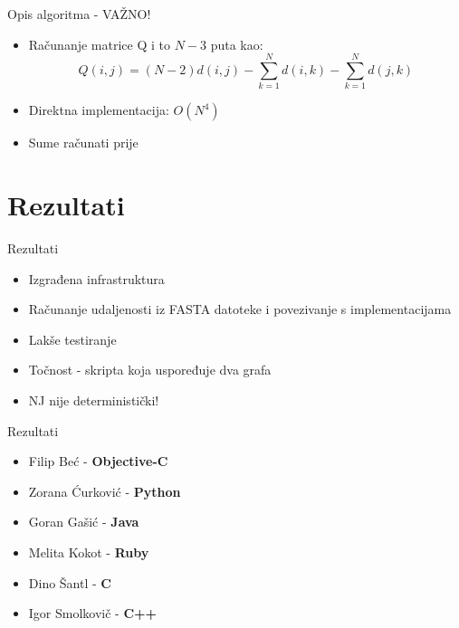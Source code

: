 \documentclass[utf8]{beamer}
\begin{document}
\begin{frame}{Opis algoritma - VAŽNO!}
\begin{itemize}
\item Računanje matrice Q i to $N-3$ puta kao: 
$$ Q(i,j) = (N-2) d(i,j) - \sum_{k=1}^{N}d(i,k) - \sum_{k=1}^{N}d(j,k) $$
\item Direktna implementacija: $O(N^4)$
\item Sume računati prije
\end{itemize}
\end{frame}


\section{Rezultati}
\begin{frame}{Rezultati}
\begin{itemize}
	\item Izgrađena infrastruktura
	\item Računanje udaljenosti iz FASTA datoteke i povezivanje s implementacijama
	\item Lakše testiranje
	\item Točnost - skripta koja uspoređuje dva grafa
	\item NJ nije deterministički!
\end{itemize}
\end{frame}

\begin{frame}{Rezultati}
\begin{itemize}
	\item Filip Beć - \textbf{Objective-C}
	\item Zorana Ćurković - \textbf{Python}
	\item Goran Gašić - \textbf{Java}
	\item Melita Kokot - \textbf{Ruby}
	\item Dino Šantl - \textbf{C}
	\item Igor Smolkovič - \textbf{C++}
\end{itemize}
\end{frame}
\end{document}
